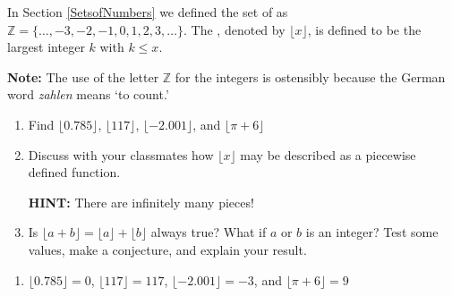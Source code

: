 {\label{greatestinteger} In Section \ref{SetsofNumbers} we defined the set of  as  $\mathbb{Z} = \{ \ldots, -3, -2, -1, 0, 1, 2, 3, \ldots\}$. The , denoted by $\lfloor x \rfloor$, is defined to be the largest integer $k$ with $k \leq x$.

\textbf{Note:} The use of the letter $\mathbb{Z}$ for the integers is ostensibly because the German word \textit{zahlen} means `to count.'

\begin{enumerate}

\item  Find $\lfloor 0.785 \rfloor$, $\lfloor 117 \rfloor$, $\lfloor -2.001 \rfloor$, and $\lfloor \pi + 6 \rfloor$

\item  Discuss with your classmates how $\lfloor x \rfloor$ may be described as a piecewise defined function.

\smallskip

\textbf{HINT:}  There are infinitely many pieces!

\item  Is $\lfloor a + b \rfloor = \lfloor a \rfloor + \lfloor b \rfloor$ always true?  What if $a$ or $b$ is an integer?  Test some values, make a conjecture, and explain your result.

\end{enumerate}
}
{\begin{enumerate}

\item  $\lfloor 0.785 \rfloor = 0$, $\lfloor 117 \rfloor = 117$, $\lfloor -2.001 \rfloor = -3$, and $\lfloor \pi + 6 \rfloor = 9$

\end{enumerate}
}